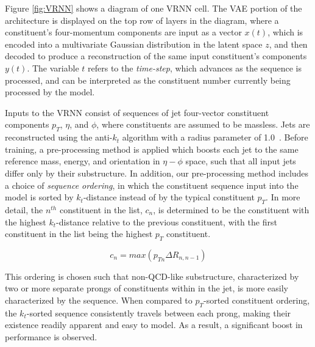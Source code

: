 \documentclass[letterpaper,11pt]{article}
\begin{document}
Figure \ref{fig:VRNN} shows a diagram of one VRNN cell. The VAE portion of the architecture is displayed on the top row of layers in the diagram, where a constituent's four-momentum components are input as a vector $x(t)$, which is encoded into a multivariate Gaussian distribution in the latent space $z$, and then decoded to produce a reconstruction of the same input constituent's components $y(t)$. The variable $t$ refers to the \textit{time-step}, which advances as the sequence is processed, and can be interpreted as the constituent number currently being processed by the model. 


Inputs to the VRNN consist of sequences of jet four-vector constituent components $p_{T}$, $\eta$, and $\phi$, where constituents are assumed to be massless.
Jets are reconstructed using the anti-$k_t$ algorithm with a radius parameter of 1.0~\cite{Cacciari_2008}.
Before training, a pre-processing method is applied which boosts each jet to the same reference mass, energy, and orientation in $\eta-\phi$ space, such that all input jets differ only by their substructure.
In addition, our pre-processing method includes a choice of \textit{sequence ordering}, in which the constituent sequence input into the model is sorted by $k_{t}$-distance instead of by the typical constituent $p_{T}$. 
In more detail, the $n^{th}$ constituent in the list, $c_{n}$, is determined to be the constituent with the highest $k_{t}$-distance relative to the previous constituent, with the first constituent in the list being the highest $p_{T}$ constituent. 

\begin{equation}
c_{n} = max(p_{Tn}\Delta R_{n, n-1})
\end{equation}

This ordering is chosen such that non-QCD-like substructure, characterized by two or more separate prongs of constituents within in the jet, is more easily characterized by the sequence. 
When compared to $p_{T}$-sorted constituent ordering, the $k_{t}$-sorted sequence consistently travels between each prong, making their existence readily apparent and easy to model. As a result, a significant boost in performance is observed.
\end{document}
